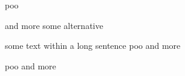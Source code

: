 \iffalse
some text within a long sentence
 \ifdim
\else
poo
\fi
and more 
\else
some alternative
\fi


\iffalse
some text within a long sentence
poo
and more
\fi


\iftrue
some text within a long sentence
poo
and more
\fi


\iffalse
some text within a long sentence
\else
poo
and more
\fi